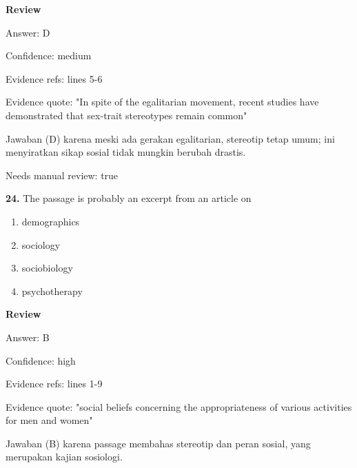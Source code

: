 \documentclass[12pt]{article}
\begin{document}
\setlength{\parindent}{0pt}
\textbf{Review}\par
Answer: D\par
Confidence: medium\par
Evidence refs: lines 5-6\par
Evidence quote: "In spite of the egalitarian movement, recent studies have demonstrated that sex-trait stereotypes remain common"\par
Jawaban (D) karena meski ada gerakan egalitarian, stereotip tetap umum; ini menyiratkan sikap sosial tidak mungkin berubah drastis.\par
Needs manual review: true\par
\endgroup
\par
\vspace{0.25\baselineskip}
\noindent\textbf{24.} The passage is probably an excerpt from an article on
\begin{enumerate}[label=(\Alph*),leftmargin=*,itemsep=0.2em]
\item demographics
\item sociology
\item sociobiology
\item psychotherapy
\end{enumerate}
\par
\begingroup
\setlength{\parskip}{0pt}
\setlength{\parindent}{0pt}
\textbf{Review}\par
Answer: B\par
Confidence: high\par
Evidence refs: lines 1-9\par
Evidence quote: "social beliefs concerning the appropriateness of various activities for men and women"\par
Jawaban (B) karena passage membahas stereotip dan peran sosial, yang merupakan kajian sosiologi.\par
\endgroup
\par
\vspace{0.25\baselineskip}
\end{document}
